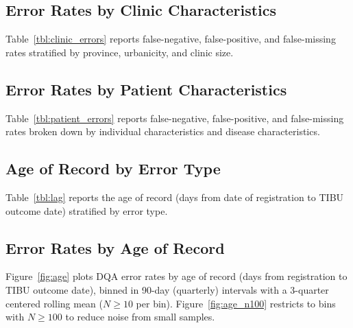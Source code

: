 \documentclass[12pt]{article}
\begin{document}
\subsection{Error Rates by Clinic Characteristics}

Table~\ref{tbl:clinic_errors} reports false-negative, false-positive, and false-missing rates stratified by province, urbanicity, and clinic size.

\begin{table}[H]
    \centering
    \caption{DQA error rates by province, urbanicity, and clinic size.}
    \label{tbl:clinic_errors}
    \resizebox{\textwidth}{!}{}
\end{table}

\subsection{Error Rates by Patient Characteristics}

Table~\ref{tbl:patient_errors} reports false-negative, false-positive, and
false-missing rates broken down by individual characteristics and disease
characteristics.

\begin{table}[H]
    \centering
    \caption{DQA error rates by individual and disease characteristics.}
    \label{tbl:patient_errors}
    \resizebox{\textwidth}{!}{}
\end{table}

\subsection{Age of Record by Error Type}

Table~\ref{tbl:lag} reports the age of record (days from date of registration
to TIBU outcome date) stratified by error type.

\begin{table}[H]
    \centering
    \caption{Age of record by error category (in days from registration to TIBU outcome date).}
    \label{tbl:lag}
    
\end{table}

\subsection{Error Rates by Age of Record}

\setcounter{figure}{1}
Figure~\ref{fig:age} plots DQA error rates by age of record (days from registration to TIBU outcome date), binned in 90-day (quarterly) intervals with a 3-quarter centered rolling mean ($N \geq 10$ per bin). Figure~\ref{fig:age_n100} restricts to bins with $N \geq 100$ to reduce noise from small samples.
\end{document}
